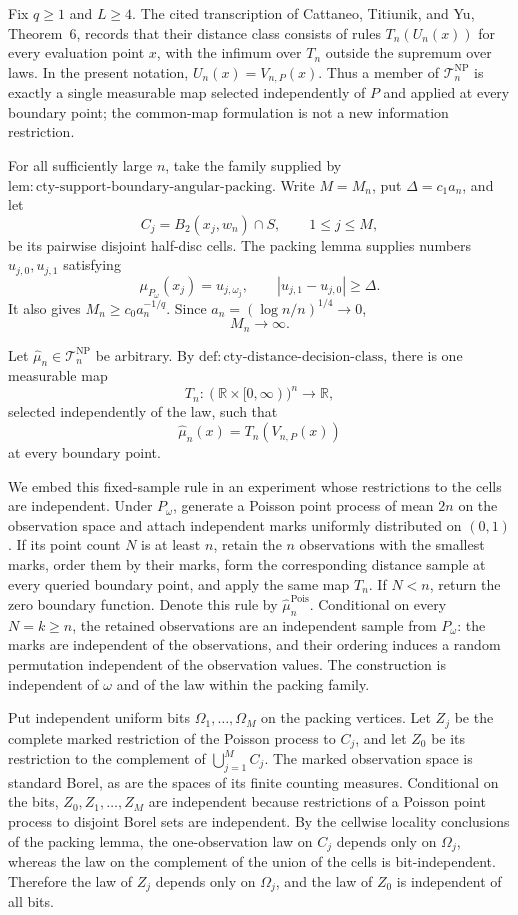 Fix \(q\geq1\) and \(L\geq4\).  The cited transcription of Cattaneo, Titiunik, and Yu, Theorem~6, records that their distance class consists of rules \(T_n(U_n(x))\) for every evaluation point \(x\), with the infimum over \(T_n\) outside the supremum over laws.  In the present notation, \(U_n(x)=V_{n,P}(x)\).  Thus a member of \(\mathcal T_n^{\mathrm{NP}}\) is exactly a single measurable map selected independently of \(P\) and applied at every boundary point; the common-map formulation is not a new information restriction.

For all sufficiently large \(n\), take the family supplied by \(\mathrm{lem:cty\text{-}support\text{-}boundary\text{-}angular\text{-}packing}\).  Write \(M=M_n\), put \(\Delta=c_1a_n\), and let
\[
 C_j=B_2(x_j,w_n)\cap S,\qquad 1\leq j\leq M,
\]
be its pairwise disjoint half-disc cells.  The packing lemma supplies numbers \(u_{j,0},u_{j,1}\) satisfying
\[
 \mu_{P_\omega}(x_j)=u_{j,\omega_j},
 \qquad |u_{j,1}-u_{j,0}|\geq\Delta.
\]
It also gives \(M_n\geq c_0a_n^{-1/q}\).  Since \(a_n=(\log n/n)^{1/4}\to0\),
\[
 M_n\longrightarrow\infty.
\]

Let \(\widehat\mu_n\in\mathcal T_n^{\mathrm{NP}}\) be arbitrary.  By \(\mathrm{def:cty\text{-}distance\text{-}decision\text{-}class}\), there is one measurable map
\[
 T_n:(\mathbb R\times[0,\infty))^n\longrightarrow\mathbb R,
\]
selected independently of the law, such that
\[
 \widehat\mu_n(x)=T_n(V_{n,P}(x))
\]
at every boundary point.

We embed this fixed-sample rule in an experiment whose restrictions to the cells are independent.  Under \(P_\omega\), generate a Poisson point process of mean \(2n\) on the observation space and attach independent marks uniformly distributed on \((0,1)\).  If its point count \(N\) is at least \(n\), retain the \(n\) observations with the smallest marks, order them by their marks, form the corresponding distance sample at every queried boundary point, and apply the same map \(T_n\).  If \(N<n\), return the zero boundary function.  Denote this rule by \(\widehat\mu_n^{\mathrm{Pois}}\).  Conditional on every \(N=k\geq n\), the retained observations are an independent sample from \(P_\omega\): the marks are independent of the observations, and their ordering induces a random permutation independent of the observation values.  The construction is independent of \(\omega\) and of the law within the packing family.

Put independent uniform bits \(\Omega_1,\ldots,\Omega_M\) on the packing vertices.  Let \(Z_j\) be the complete marked restriction of the Poisson process to \(C_j\), and let \(Z_0\) be its restriction to the complement of \(\bigcup_{j=1}^M C_j\).  The marked observation space is standard Borel, as are the spaces of its finite counting measures.  Conditional on the bits, \(Z_0,Z_1,\ldots,Z_M\) are independent because restrictions of a Poisson point process to disjoint Borel sets are independent.  By the cellwise locality conclusions of the packing lemma, the one-observation law on \(C_j\) depends only on \(\Omega_j\), whereas the law on the complement of the union of the cells is bit-independent.  Therefore the law of \(Z_j\) depends only on \(\Omega_j\), and the law of \(Z_0\) is independent of all bits.

